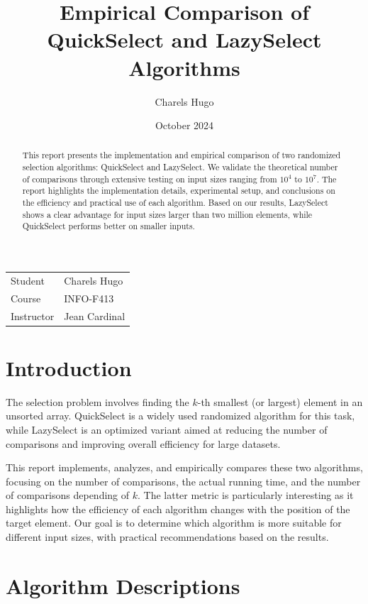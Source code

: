 \documentclass{article}
\title{Empirical Comparison of QuickSelect and LazySelect Algorithms}
\author{Charels Hugo}
\date{October 2024}
\begin{document}
\maketitle

\noindent\begin{tabular}{@{}ll}
    Student & Charels Hugo \\
    Course  & INFO-F413 \\
    Instructor  & Jean Cardinal
\end{tabular}


\begin{abstract}
This report presents the implementation and empirical comparison of two randomized selection algorithms: QuickSelect and LazySelect. We validate the theoretical number of comparisons through extensive testing on input sizes ranging from \(10^4\) to \(10^7\). The report highlights the implementation details, experimental setup, and conclusions on the efficiency and practical use of each algorithm. Based on our results, LazySelect shows a clear advantage for input sizes larger than two million elements, while QuickSelect performs better on smaller inputs.
\end{abstract}



\section{Introduction}
The selection problem involves finding the \(k\)-th smallest (or largest) element in an unsorted array. QuickSelect is a widely used randomized algorithm for this task, while LazySelect is an optimized variant aimed at reducing the number of comparisons and improving overall efficiency for large datasets.

This report implements, analyzes, and empirically compares these two algorithms, focusing on the number of comparisons, the actual running time, and the number of comparisons depending of \(k\). The latter metric is particularly interesting as it highlights how the efficiency of each algorithm changes with the position of the target element. Our goal is to determine which algorithm is more suitable for different input sizes, with practical recommendations based on the results.



\section{Algorithm Descriptions}
\end{document}
